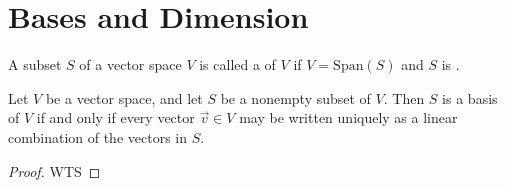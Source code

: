 \documentclass[11pt,fleqn]{book} %
\begin{document}
\section{Bases and Dimension}

\begin{definition}[Basis]
    A subset $S$ of a vector space $V$ is called a  of $V$ if $V = \mathrm{Span}(S)$ and $S$ is .
\end{definition}

\setcounter{dummy}{2}
\begin{theorem}
    Let $V$ be a vector space, and let $S$ be a nonempty subset of $V$. Then $S$ is a basis of $V$ if and only if every vector $\vec{v} \in V$ may be written uniquely as a linear combination of the vectors in $S$.
\end{theorem}

\begin{proof}
    WTS
\end{proof}
\end{document}
